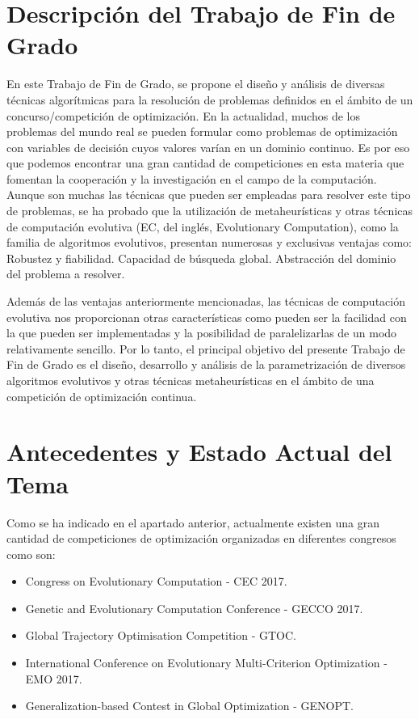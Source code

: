 
\section{Descripción del Trabajo de Fin de Grado}
\label{sec:DESCRIPTION}

En este Trabajo de Fin de Grado, se propone el diseño y análisis de diversas técnicas algorítmicas para la resolución de problemas definidos en el ámbito de un concurso/competición de optimización.
	En la actualidad,  muchos de los problemas del mundo real se pueden formular como problemas de optimización con variables de decisión cuyos valores varían en un dominio continuo. Es por eso que podemos encontrar una gran cantidad de competiciones en esta materia que fomentan la cooperación y la investigación en el campo de la computación. Aunque son muchas las técnicas que pueden ser empleadas para resolver este tipo de problemas, se ha probado que la utilización de metaheurísticas y otras técnicas de computación evolutiva (EC, del inglés, Evolutionary Computation), como la familia de algoritmos evolutivos, presentan numerosas y exclusivas ventajas como:
Robustez y fiabilidad.
Capacidad de búsqueda global.
Abstracción del dominio del problema a resolver.

Además de las ventajas anteriormente mencionadas, las técnicas de computación evolutiva nos proporcionan otras características como pueden ser la facilidad con la que pueden ser implementadas y la posibilidad de paralelizarlas de un modo relativamente sencillo.
	Por lo tanto, el principal objetivo del presente Trabajo de Fin de Grado es el diseño, desarrollo y análisis de la parametrización de diversos algoritmos evolutivos y otras técnicas metaheurísticas en el ámbito de una competición de optimización continua. 
\section{Antecedentes y Estado Actual del Tema}
\label{sec:SUBJECT}

Como se ha indicado en el apartado anterior, actualmente existen una gran cantidad de competiciones de optimización organizadas en diferentes congresos como son:
\begin{itemize}
  \item Congress on Evolutionary Computation - CEC 2017.
  \item Genetic and Evolutionary Computation Conference - GECCO 2017.
  \item Global Trajectory Optimisation Competition - GTOC.
  \item International Conference on Evolutionary Multi-Criterion Optimization - EMO 2017.
  \item Generalization-based Contest in Global Optimization - GENOPT.
\end{itemize}

